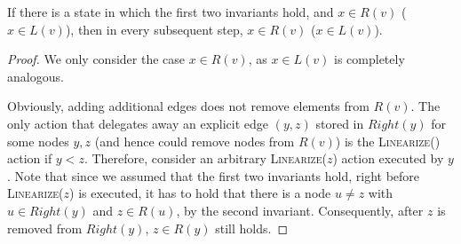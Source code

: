 \documentclass[a4paper,USenglish]{lipics}
\newcommand{\linearize}[1]{\textsc{Linearize(\ensuremath{#1})}\xspace}
\begin{document}
\begin{lemma}\label{lem:R_grows_monotonically}
  If there is a state in which the first two invariants hold, and $x \in R(v)$ ($x \in L(v)$), then in every subsequent step, $x \in R(v)$ ($x \in L(v)$).
\end{lemma}
\begin{proof}
We only consider the case $x \in R(v)$, as $x \in L(v)$ is completely analogous.

Obviously, adding additional edges does not remove elements from $R(v)$.
The only action that delegates away an explicit edge $(y,z)$ stored in $Right(y)$ for some nodes $y,z$ (and hence could remove nodes from $R(v)$) is the \linearize{} action if $y < z$.
Therefore, consider an arbitrary \linearize{z} action executed by $y$.
Note that since we assumed that the first two invariants hold, right before \linearize{z} is executed, it has to hold that there is a node $u \neq z$ with $u \in Right(y)$ and $z \in R(u)$, by the second invariant.
Consequently, after $z$ is removed from $Right(y)$, $z \in R(y)$ still holds.
\end{proof}
\end{document}
